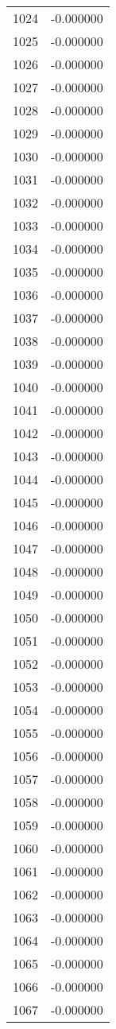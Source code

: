 \documentclass[12pt]{article}
\begin{document}
\begin{longtable}{@{}cc@{}}
1024 & -0.000000 \\
1025 & -0.000000 \\
1026 & -0.000000 \\
1027 & -0.000000 \\
1028 & -0.000000 \\
1029 & -0.000000 \\
1030 & -0.000000 \\
1031 & -0.000000 \\
1032 & -0.000000 \\
1033 & -0.000000 \\
1034 & -0.000000 \\
1035 & -0.000000 \\
1036 & -0.000000 \\
1037 & -0.000000 \\
1038 & -0.000000 \\
1039 & -0.000000 \\
1040 & -0.000000 \\
1041 & -0.000000 \\
1042 & -0.000000 \\
1043 & -0.000000 \\
1044 & -0.000000 \\
1045 & -0.000000 \\
1046 & -0.000000 \\
1047 & -0.000000 \\
1048 & -0.000000 \\
1049 & -0.000000 \\
1050 & -0.000000 \\
1051 & -0.000000 \\
1052 & -0.000000 \\
1053 & -0.000000 \\
1054 & -0.000000 \\
1055 & -0.000000 \\
1056 & -0.000000 \\
1057 & -0.000000 \\
1058 & -0.000000 \\
1059 & -0.000000 \\
1060 & -0.000000 \\
1061 & -0.000000 \\
1062 & -0.000000 \\
1063 & -0.000000 \\
1064 & -0.000000 \\
1065 & -0.000000 \\
1066 & -0.000000 \\
1067 & -0.000000 \\

\end{longtable}
\end{document}
